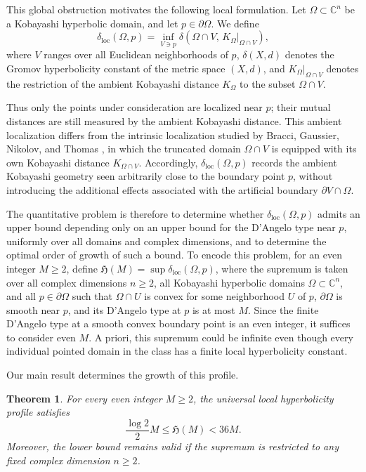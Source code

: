\documentclass[11pt]{article}
\newtheorem{theorem}{Theorem}[section]
\theoremstyle{definition}
\newcommand{\C}{\mathbb{C}}
\begin{document}
This global obstruction motivates the following local formulation. Let
\(\Omega\subset\C^n\) be a Kobayashi hyperbolic domain, and let
\(p\in\partial\Omega\). We define
\[
\delta_{\mathrm{loc}}(\Omega,p)
=
\inf_{V\ni p}
\delta\left(
\Omega\cap V,\,
\left.K_\Omega\right|_{\Omega\cap V}
\right),
\]
where \(V\) ranges over all Euclidean neighborhoods of \(p\),
\(\delta(X,d)\) denotes the Gromov hyperbolicity constant of the metric
space \((X,d)\), and \(\left.K_\Omega\right|_{\Omega\cap V}\) denotes
the restriction of the ambient Kobayashi distance \(K_\Omega\) to the
subset \(\Omega\cap V\).

Thus only the points under consideration are localized near \(p\); their
mutual distances are still measured by the ambient Kobayashi distance.
This ambient localization differs from the intrinsic localization
studied by Bracci, Gaussier, Nikolov, and Thomas
\cite{BracciGaussierNikolovThomas}, in which the truncated domain
\(\Omega\cap V\) is equipped with its own Kobayashi distance
\(K_{\Omega\cap V}\). Accordingly, \(\delta_{\mathrm{loc}}(\Omega,p)\)
records the ambient Kobayashi geometry seen arbitrarily close to the
boundary point \(p\), without introducing the additional effects
associated with the artificial boundary \(\partial V\cap\Omega\).

The quantitative problem is therefore to determine whether
\(\delta_{\mathrm{loc}}(\Omega,p)\) admits an upper bound depending only
on an upper bound for the D'Angelo type near \(p\), uniformly over all
domains and complex dimensions, and to determine the optimal order of
growth of such a bound. To encode this problem, for an even integer \(M\ge2\), define
\(\mathfrak H(M)=\sup\delta_{\mathrm{loc}}(\Omega,p)\), where the
supremum is taken over all complex dimensions \(n\ge2\), all Kobayashi
hyperbolic domains \(\Omega\subset\C^n\), and all \(p\in\partial\Omega\)
such that \(\Omega\cap U\) is convex for some neighborhood \(U\) of \(p\),
\(\partial\Omega\) is smooth near \(p\), and its D'Angelo type at \(p\)
is at most \(M\). Since the finite D'Angelo type at a smooth convex boundary point is an
even integer, it suffices to consider even \(M\). A
priori, this supremum could be infinite even though every individual
pointed domain in the class has a finite local hyperbolicity constant.

Our main result determines the growth of this profile.

\begin{theorem}
	\label{thm:universal-growth}
	For every even integer \(M\ge2\), the universal local hyperbolicity profile
	satisfies
	\begin{equation*}
		\frac{\log 2}{2}M
		\le
		\mathfrak H(M)
		<
		36M.
	\end{equation*}
	Moreover, the lower bound remains valid if the supremum is restricted
	to any fixed complex dimension \(n\ge2\).
\end{theorem}
\end{document}
